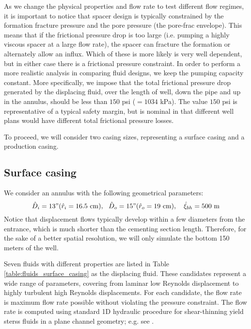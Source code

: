 \documentclass[review]{elsarticle}
\begin{document}
As we change the physical properties and flow rate to test different flow regimes, it is important to notice that spacer design is typically constrained by the formation fracture pressure  and the pore pressure (the pore-frac envelope). This means that if the frictional pressure drop is too large (i.e. pumping a highly viscous spacer at a large flow rate), the spacer can fracture the formation or alternately allow an influx. Which of these is more likely is very well dependent, but in either case there is a frictional pressure constraint. In order to perform a more realistic analysis in comparing fluid designs, we keep the pumping capacity constant. More specifically, we impose that the total frictional pressure drop generated by the displacing fluid, over the length of well, down the pipe and up in the annulus, should be less than $150$ psi ($=1034$ kPa). The value $150$ psi is representative of a typical safety margin, but is nominal in that different well plans would have different total frictional pressure losses. 

To proceed, we will consider two casing sizes, representing a surface casing and a production casing. 
\subsection{Surface casing}\label{sec:surface}
We consider an annulus with the following geometrical parameters:
%
\begin{equation}\label{eq:well_surface}
	 \hat D_{i} = 13" (\hat r_i = 16.5 \text{ cm}), ~~\hat D_{o} = 15" (\hat r_o = 19 \text{ cm}), ~~~ \hat \xi_{bh} = 500\text{ m} 
\end{equation}
%
Notice that displacement flows typically develop within a few diameters from the entrance, which is much shorter than the cementing section length. Therefore, for the sake of a better spatial resolution, we will only simulate the bottom 150 meters of the well. 

Seven fluids with different properties are listed in Table \ref{table:fluids_surface_casing} as the displacing fluid. These candidates represent a wide range of parameters, covering from laminar low Reynolds displacement to highly turbulent high Reynolds displacements. For each candidate, the flow rate is maximum flow rate possible without violating the pressure constraint. The flow rate is computed using standard 1D hydraulic procedure for shear-thinning yield sterss fluids in a plane channel geometry; e.g. see \cite{Maleki2016}.
\end{document}
